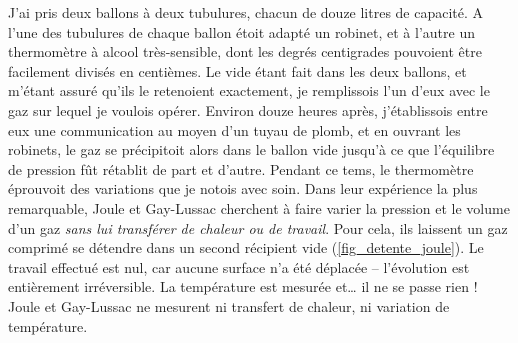 			J’ai pris deux ballons à deux tubulures, chacun de douze litres de capacité. A l’une des tubulures de chaque ballon étoit adapté un robinet, et à l’autre un thermomètre à alcool très-sensible, dont les degrés centigrades pouvoient être facilement divisés en centièmes. \jecourte Le vide étant fait dans les deux ballons, et m’étant assuré qu’ils le retenoient exactement, je remplissois l’un d’eux avec le gaz sur lequel je voulois opérer. Environ douze heures après, j’établissois entre eux une communication au moyen d’un tuyau de plomb, et en ouvrant les robinets, le gaz se précipitoit alors dans le ballon vide jusqu’à ce que l’équilibre de pression fût rétablit de part et d’autre. Pendant ce tems, le thermomètre éprouvoit des variations que je notois avec soin.
		Dans leur expérience la plus remarquable, Joule et Gay-Lussac cherchent à faire varier la pression et le volume d’un gaz \emph{sans lui transférer de chaleur ou de travail}. Pour cela, ils laissent un gaz comprimé se détendre dans un second récipient vide (\cref{fig_detente_joule}). Le travail effectué est nul, car aucune surface n’a été déplacée – l’évolution est entièrement irréversible. La température est mesurée et… il ne se passe rien ! Joule et Gay-Lussac ne mesurent ni transfert de chaleur, ni variation de température.

